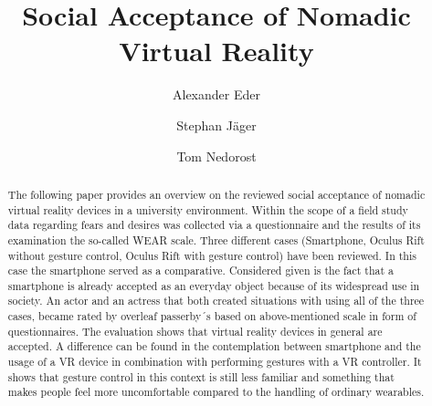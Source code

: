 \documentclass[sigchi]{acmart}
\begin{document}
\title{Social Acceptance of Nomadic Virtual Reality}

\author{Alexander Eder}

\author{Stephan Jäger}

\author{Tom Nedorost}

\renewcommand{\shortauthors}{Eder and Jäger and Nedorost}
\linenumbers

\begin{abstract}
The following paper provides an overview on the reviewed social acceptance of nomadic virtual reality devices in a university environment. Within the scope of a field study data regarding fears and desires was collected via a questionnaire and the results of its examination the so-called WEAR scale. Three different cases (Smartphone, Oculus Rift without gesture control, Oculus Rift with gesture control) have been reviewed. In this case the smartphone served as a comparative. Considered given is the fact that a smartphone is already accepted as an everyday object because of its widespread use in society.
An actor and an actress that both created situations with using all of the three cases, became rated by overleaf passerby´s based on above-mentioned scale in form of questionnaires. The evaluation shows that virtual reality devices in general are accepted. A difference can be found in the contemplation between smartphone and the usage of a VR device in combination with performing gestures with a VR controller. It shows that gesture control in this context is still less familiar and something that makes people feel more uncomfortable compared to the handling of ordinary wearables.
\end{abstract}
\end{document}
